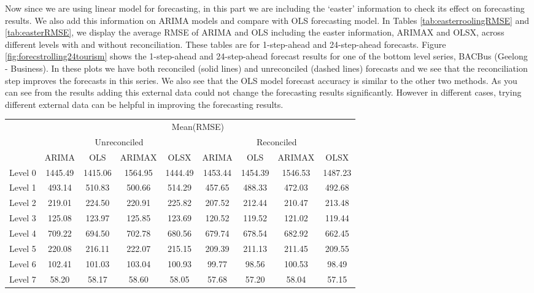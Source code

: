 \documentclass[11pt,a4paper,]{article}
\let\origtable\table
\let\endorigtable\endtable
\renewenvironment{table}[1][2] {
    \expandafter\origtable\expandafter[htbp]
} {
    \endorigtable
}
\begin{document}
Now since we are using linear model for forecasting, in this part we are including the `easter' information to check its effect on forecasting results. We also add this information on ARIMA models and compare with OLS forecasting model. In Tables \ref{tab:easterroolingRMSE} and \ref{tab:easterRMSE}, we display the average RMSE of ARIMA and OLS including the easter information, ARIMAX and OLSX, across different levels with and without reconciliation. These tables are for 1-step-ahead and 24-step-ahead forecasts. Figure \ref{fig:forecstrolling24tourism} shows the 1-step-ahead and 24-step-ahead forecast results for one of the bottom level series, BACBus (Geelong - Business). In these plots we have both reconciled (solid lines) and unreconciled (dashed lines) forecasts and we see that the reconciliation step improves the forecasts in this series. We also see that the OLS model forecast accuracy is similar to the other two methods. As you can see from the results adding this external data could not change the forecasting results significantly. However in different cases, trying different external data can be helpful in improving the forecasting results.

\begin{table}[t]

\caption{\label{tab:easterroolingRMSE}Mean(RMSE) for ARIMAX and OLSX, adding easter information, with and without reconciliation - 1-step-ahead - Tourism dataset}
\centering
\begin{tabular}{ccccccccc}
\toprule
\multicolumn{1}{c}{} & \multicolumn{8}{c}{Mean(RMSE)} \\
\cmidrule(l{3pt}r{3pt}){2-9}
\multicolumn{1}{c}{} & \multicolumn{4}{c}{Unreconciled} & \multicolumn{4}{c}{Reconciled} \\
\cmidrule(l{3pt}r{3pt}){2-5} \cmidrule(l{3pt}r{3pt}){6-9}
 & ARIMA & OLS & ARIMAX & OLSX & ARIMA & OLS & ARIMAX & OLSX\\
\midrule
Level 0 & 1445.49 & 1415.06 & 1564.95 & 1444.49 & 1453.44 & 1454.39 & 1546.53 & 1487.23\\
Level 1 & 493.14 & 510.83 & 500.66 & 514.29 & 457.65 & 488.33 & 472.03 & 492.68\\
Level 2 & 219.01 & 224.50 & 220.91 & 225.82 & 207.52 & 212.44 & 210.47 & 213.48\\
Level 3 & 125.08 & 123.97 & 125.85 & 123.69 & 120.52 & 119.52 & 121.02 & 119.44\\
Level 4 & 709.22 & 694.50 & 702.78 & 680.56 & 679.74 & 678.54 & 682.92 & 662.45\\
Level 5 & 220.08 & 216.11 & 222.07 & 215.15 & 209.39 & 211.13 & 211.45 & 209.55\\
Level 6 & 102.41 & 101.03 & 103.04 & 100.93 & 99.77 & 98.56 & 100.53 & 98.49\\
Level 7 & 58.20 & 58.17 & 58.60 & 58.05 & 57.68 & 57.20 & 58.04 & 57.15\\
\bottomrule
\end{tabular}
\end{table}
\end{document}
